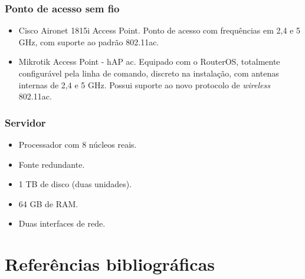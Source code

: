 \documentclass[	DIV=calc,%
							paper=a4,%
							fontsize=12pt,%
							onecolumn]{scrartcl}	 					%
\begin{document}
\subsubsection{Ponto de acesso sem fio}
\begin{itemize}
	\item{Cisco Aironet 1815i Access Point}. Ponto de acesso com frequências em 2,4 e 5 GHz, com suporte ao padrão 802.11ac.
	\item{Mikrotik Access Point - hAP ac}. Equipado com o RouterOS, totalmente configurável pela linha de comando, discreto  na instalação, com antenas internas de 2,4 e 5 GHz. Possui suporte ao novo protocolo de \textit{wireless} 802.11ac.  
\end{itemize}

\subsubsection{Servidor}
\begin{itemize}
	\item Processador com 8 núcleos reais.
	\item Fonte redundante.
	\item 1 TB de disco (duas unidades).
	\item 64 GB de RAM.
	\item Duas interfaces de rede.
\end{itemize}

\pagebreak
\section{Referências bibliográficas}


\renewcommand\refname{} %

  
\end{document}

